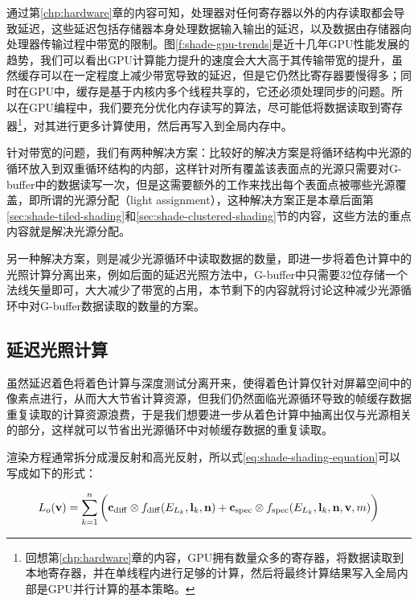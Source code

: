通过第\ref{chp:hardware}章的内容可知，处理器对任何寄存器以外的内存读取都会导致延迟，这些延迟包括存储器本身处理数据输入输出的延迟，以及数据由存储器向处理器传输过程中带宽的限制。图\ref{f:shade-gpu-trends}是近十几年GPU性能发展的趋势，我们可以看出GPU计算能力提升的速度会大大高于其传输带宽的提升，虽然缓存可以在一定程度上减少带宽导致的延迟，但是它仍然比寄存器要慢得多；同时在GPU中，缓存是基于内核内多个线程共享的，它还必须处理同步的问题。所以在GPU编程中，我们要充分优化内存读写的算法，尽可能低将数据读取到寄存器\footnote{回想第\ref{chp:hardware}章的内容，GPU拥有数量众多的寄存器，将数据读取到本地寄存器，并在单线程内进行足够的计算，然后将最终计算结果写入全局内部是GPU并行计算的基本策略。}，对其进行更多计算使用，然后再写入到全局内存中。

针对带宽的问题，我们有两种解决方案：比较好的解决方案是将循环结构中光源的循环放入到双重循环结构的内部，这样针对所有覆盖该表面点的光源只需要对G-buffer中的数据读写一次，但是这需要额外的工作来找出每个表面点被哪些光源覆盖，即所谓的光源分配（light assignment），这种解决方案正是本章后面第\ref{sec:shade-tiled-shading}和\ref{sec:shade-clustered-shading}节的内容，这些方法的重点内容就是解决光源分配。

另一种解决方案，则是减少光源循环中读取数据的数量，即进一步将着色计算中的光照计算分离出来，例如后面的延迟光照方法中，G-buffer中只需要32位存储一个法线矢量即可，大大减少了带宽的占用，本节剩下的内容就将讨论这种减少光源循环中对G-buffer数据读取的数量的方案。





\subsection{延迟光照计算}\label{sec:shade-deferred-lighting}
虽然延迟着色将着色计算与深度测试分离开来，使得着色计算仅针对屏幕空间中的像素点进行，从而大大节省计算资源，但我们仍然面临光源循环导致的帧缓存数据重复读取的计算资源浪费，于是我们想要进一步从着色计算中抽离出仅与光源相关的部分，这样就可以节省出光源循环中对帧缓存数据的重复读取。

渲染方程通常拆分成漫反射和高光反射，所以式\ref{eq:shade-shading-equation}可以写成如下的形式：

\begin{equation}
	L_o(\mathbf{v})=\sum^{n}_{k=1}\bigg(\mathbf{c}_{\rm diff}\otimes f_{\rm diff}(E_{L_k},\mathbf{l}_k,\mathbf{n})+\mathbf{c}_{\rm spec}\otimes f_{\rm spec}(E_{L_k},\mathbf{l}_k,\mathbf{n},\mathbf{v},m)\bigg)
\end{equation}


